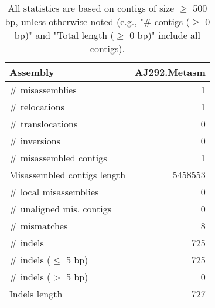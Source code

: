 \documentclass[12pt,a4paper]{article}
\begin{document}
\begin{table}[ht]
\begin{center}
\caption{All statistics are based on contigs of size $\geq$ 500 bp, unless otherwise noted (e.g., "\# contigs ($\geq$ 0 bp)" and "Total length ($\geq$ 0 bp)" include all contigs).}
\begin{tabular}{|l*{1}{|r}|}
\hline
Assembly & AJ292.Metasm \\ \hline
\# misassemblies & 1 \\ \hline
\hspace{5mm}\# relocations & 1 \\ \hline
\hspace{5mm}\# translocations & 0 \\ \hline
\hspace{5mm}\# inversions & 0 \\ \hline
\# misassembled contigs & 1 \\ \hline
Misassembled contigs length & 5458553 \\ \hline
\# local misassemblies & 0 \\ \hline
\# unaligned mis. contigs & 0 \\ \hline
\# mismatches & 8 \\ \hline
\# indels & 725 \\ \hline
\hspace{5mm}\# indels ($\leq$ 5 bp) & 725 \\ \hline
\hspace{5mm}\# indels ($>$ 5 bp) & 0 \\ \hline
Indels length & 727 \\ \hline
\end{tabular}
\end{center}
\end{table}
\end{document}
